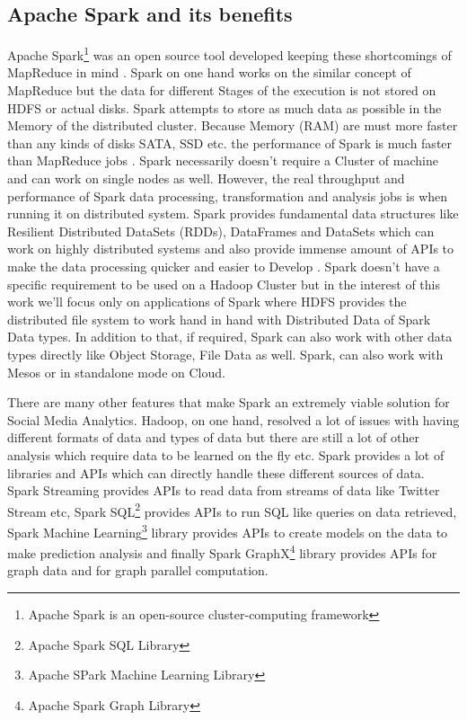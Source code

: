 \documentclass[sigconf]{acmart}
\begin{document}
\subsection{Apache Spark and its benefits}
Apache Spark\footnote{Apache Spark is an open-source cluster-computing framework} was an open source tool developed keeping these shortcomings of MapReduce in mind  \cite{sparkvsmapr}. Spark on one hand works on the similar concept of MapReduce but the data for different Stages of the execution is not stored on HDFS or actual disks. Spark attempts to store as much data as possible in the Memory of the distributed cluster. Because Memory (RAM) are must more faster than any kinds of disks SATA, SSD etc. the performance of Spark is much faster than MapReduce jobs  \cite{sparkvsmapr}. Spark necessarily doesn't require a Cluster of machine and can work on single nodes as well. However, the real throughput and performance of Spark data processing, transformation and analysis jobs is when running it on distributed system. Spark provides fundamental data structures like Resilient Distributed DataSets (RDDs), DataFrames and DataSets which can work on highly distributed systems and also provide immense amount of APIs to make the data processing quicker and easier to Develop  \cite{sparkrdddfds}. Spark doesn't have a specific requirement to be used on a Hadoop Cluster but in the interest of this work we'll focus only on applications of Spark where HDFS provides the distributed file system to work hand in hand with Distributed Data of Spark Data types. In addition to that, if required, Spark can also work with other data types directly like Object Storage, File Data as well. Spark, can also work with Mesos or in standalone mode on Cloud.

There are many other features that make Spark an extremely viable solution for Social Media Analytics. Hadoop, on one hand, resolved a lot of issues with having different formats of data and types of data but there are still a lot of other analysis which require data to be learned on the fly etc. Spark provides a lot of libraries and APIs which can directly handle these different sources of data. Spark Streaming provides APIs to read data from streams of data like Twitter Stream etc, Spark SQL\footnote{Apache Spark SQL Library} provides APIs to run SQL like queries on data retrieved, Spark Machine Learning\footnote{Apache SPark Machine Learning Library} library provides APIs to create models on the data to make prediction analysis and finally Spark GraphX\footnote{Apache Spark Graph Library} library provides APIs for graph data and for graph parallel computation.
\end{document}
